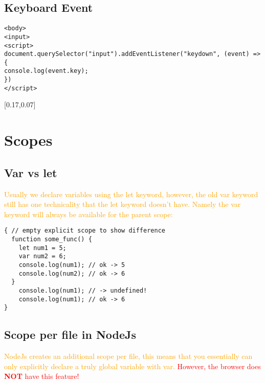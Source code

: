 \documentclass[main.tex,fontsize=6pt,paper=a4,paper=landscape,DIV=calc,]{scrartcl}
\begin{document}
\begin{multicols*}{4}
\subsection{Keyboard Event}  
\vspace{-2mm}
\begin{lstlisting}
<body>
<input>
<script>
document.querySelector("input").addEventListener("keydown", (event) => {
console.log(event.key);
})
</script>
\end{lstlisting}
\vspace{2mm}
[0.17,0.07]

\section{Scopes}

\subsection{Var vs let}  
\textcolor{orange}{Usually we declare variables using the let keyword, however, the old var keyword still has one technicality that the let keyword doesn't have. Namely the var keyword will always be available for the parent scope:}\newline
\vspace{-2mm}
\begin{lstlisting}
{ // empty explicit scope to show difference
  function some_func() {
    let num1 = 5;
    var num2 = 6;
    console.log(num1); // ok -> 5
    console.log(num2); // ok -> 6
  }
    console.log(num1); // -> undefined!
    console.log(num1); // ok -> 6
}
\end{lstlisting}
\vspace{2mm}

\subsection{Scope per file in NodeJs} 
\textcolor{orange}{NodeJs creates an additional scope per file, this means that you essentially can only explicitly declare a truly global variable with var.}\newline
\textcolor{red}{However, the browser does \textbf{NOT} have this feature!}


\end{multicols*}
\end{document}
